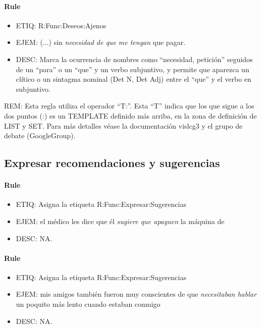 \documentclass[11pt]{report}
\begin{document}
\paragraph*{Rule}
\begin{itemize}
\item ETIQ: R:Func:Deseos:Ajenos
\item EJEM: (...) sin \emph{necesidad de que me tengan} que pagar.
\item DESC: Marca la ocurrencia de nombres como ``necesidad, petición'' seguidos de un ``para'' o un ``que'' y un verbo subjuntivo, y permite que aparezca un clítico o un sintagma nominal (Det N, Det Adj) entre el ``que'' y el verbo en subjuntivo.
\end{itemize}

REM: Esta regla utiliza el operador ``T:''. Esta ``T'' indica que los que sigue a los dos puntos (:) es un TEMPLATE definido más arriba, en la zona de definición de LIST y SET. Para más detalles véase la documentación vislcg3 y el grupo de debate (GoogleGroup).
\subsection{Expresar recomendaciones y sugerencias}
\paragraph*{Rule}
\begin{itemize}
\item ETIQ: Asigna la etiqueta R:Func:Expresar:Sugerencias
\item EJEM: el médico les dice que él \emph{sugiere que apaguen} la máquina de  
\item DESC: NA.
\end{itemize}

\paragraph*{Rule}
\begin{itemize}
\item ETIQ: Asigna la etiqueta R:Func:Expresar:Sugerencias
\item EJEM: mis amigos también fueron muy conscientes de que \emph{necesitaban hablar} un poquito más lento cuando estaban conmigo 
\item DESC: NA.
\end{itemize}
\end{document}
